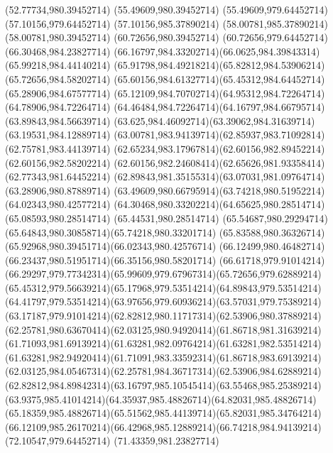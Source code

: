 {{	\lineto(52.77734,980.39452714)
	\lineto(55.49609,980.39452714)
	\lineto(55.49609,979.64452714)
	\closepath
	\moveto(57.10156,979.64452714)
	\lineto(57.10156,985.37890214)
	\lineto(58.00781,985.37890214)
	\lineto(58.00781,980.39452714)
	\lineto(60.72656,980.39452714)
	\lineto(60.72656,979.64452714)
	\closepath
	\moveto(66.30468,984.23827714)
	\curveto(66.16797,984.33202714)(66.0625,984.39843314)(65.99218,984.44140214)
	\curveto(65.91798,984.49218214)(65.82812,984.53906214)(65.72656,984.58202714)
	\curveto(65.60156,984.61327714)(65.45312,984.64452714)(65.28906,984.67577714)
	\curveto(65.12109,984.70702714)(64.95312,984.72264714)(64.78906,984.72264714)
	\curveto(64.46484,984.72264714)(64.16797,984.66795714)(63.89843,984.56639714)
	\curveto(63.625,984.46092714)(63.39062,984.31639714)(63.19531,984.12889714)
	\curveto(63.00781,983.94139714)(62.85937,983.71092814)(62.75781,983.44139714)
	\curveto(62.65234,983.17967814)(62.60156,982.89452214)(62.60156,982.58202214)
	\curveto(62.60156,982.24608414)(62.65626,981.93358414)(62.77343,981.64452214)
	\curveto(62.89843,981.35155314)(63.07031,981.09764714)(63.28906,980.87889714)
	\curveto(63.49609,980.66795914)(63.74218,980.51952214)(64.02343,980.42577214)
	\curveto(64.30468,980.33202214)(64.65625,980.28514714)(65.08593,980.28514714)
	\lineto(65.44531,980.28514714)
	\curveto(65.54687,980.29294714)(65.64843,980.30858714)(65.74218,980.33201714)
	\curveto(65.83588,980.36326714)(65.92968,980.39451714)(66.02343,980.42576714)
	\curveto(66.12499,980.46482714)(66.23437,980.51951714)(66.35156,980.58201714)
	\lineto(66.61718,979.91014214)
	\curveto(66.29297,979.77342314)(65.99609,979.67967314)(65.72656,979.62889214)
	\curveto(65.45312,979.56639214)(65.17968,979.53514214)(64.89843,979.53514214)
	\curveto(64.41797,979.53514214)(63.97656,979.60936214)(63.57031,979.75389214)
	\curveto(63.17187,979.91014214)(62.82812,980.11717314)(62.53906,980.37889214)
	\curveto(62.25781,980.63670414)(62.03125,980.94920414)(61.86718,981.31639214)
	\curveto(61.71093,981.69139214)(61.63281,982.09764214)(61.63281,982.53514214)
	\curveto(61.63281,982.94920414)(61.71091,983.33592314)(61.86718,983.69139214)
	\curveto(62.03125,984.05467314)(62.25781,984.36717314)(62.53906,984.62889214)
	\curveto(62.82812,984.89842314)(63.16797,985.10545414)(63.55468,985.25389214)
	\curveto(63.9375,985.41014214)(64.35937,985.48826714)(64.82031,985.48826714)
	\curveto(65.18359,985.48826714)(65.51562,985.44139714)(65.82031,985.34764214)
	\curveto(66.12109,985.26170214)(66.42968,985.12889214)(66.74218,984.94139214)
	\closepath
	\moveto(72.10547,979.64452714)
	\lineto(71.43359,981.23827714)
}}
